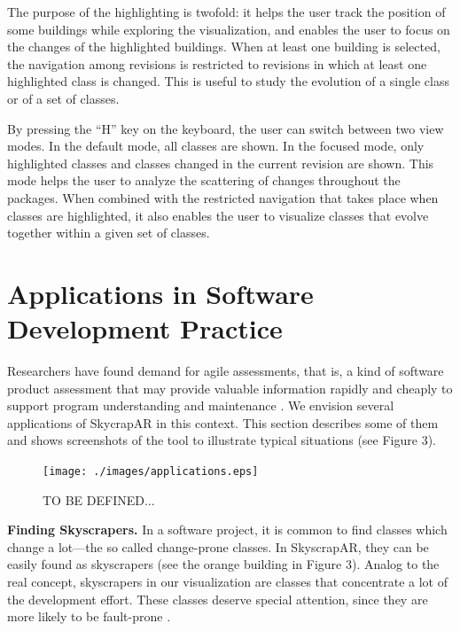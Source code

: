 The purpose of the highlighting is twofold: it helps the user track the position of some buildings while exploring the visualization, and enables the user to focus on the changes of the highlighted buildings. When at least one building is selected, the navigation among revisions is restricted to revisions in which at least one highlighted class is changed. This is useful to study the evolution of a single class or of a set of classes.

By pressing the “H” key on the keyboard, the user can switch between two view modes. In the default mode, all classes are shown. In the focused mode, only highlighted classes and classes changed in the current revision are shown. This mode helps the user to analyze the scattering of changes throughout the packages. When combined with the restricted navigation that takes place when classes are highlighted, it also enables the user to visualize classes that evolve together within a given set of classes.

\section{Applications in Software Development Practice} \label{sec:applications}

Researchers have found demand for agile assessments, that is, a kind of software product assessment that may provide valuable information rapidly and cheaply to support program understanding and maintenance \cite{nierstrasz:2012}. We envision several applications of SkycrapAR in this context. This section describes some of them and shows screenshots of the tool to illustrate typical situations (see Figure 3).

\begin{figure}[t]
 \centering
 \texttt{[image: ./images/applications.eps]}
 \caption{TO BE DEFINED...}
 \label{fig:TOBEDEFINED}
\end{figure}

\textbf{Finding Skyscrapers.} In a software project, it is common to find classes which change a lot—the so called change-prone classes. In SkyscrapAR, they can be easily found as skyscrapers (see the orange building in Figure 3). Analog to the real concept, skyscrapers in our visualization are classes that concentrate a lot of the development effort. These classes deserve special attention, since they are more likely to be fault-prone \cite{nagappan:2005}. 

